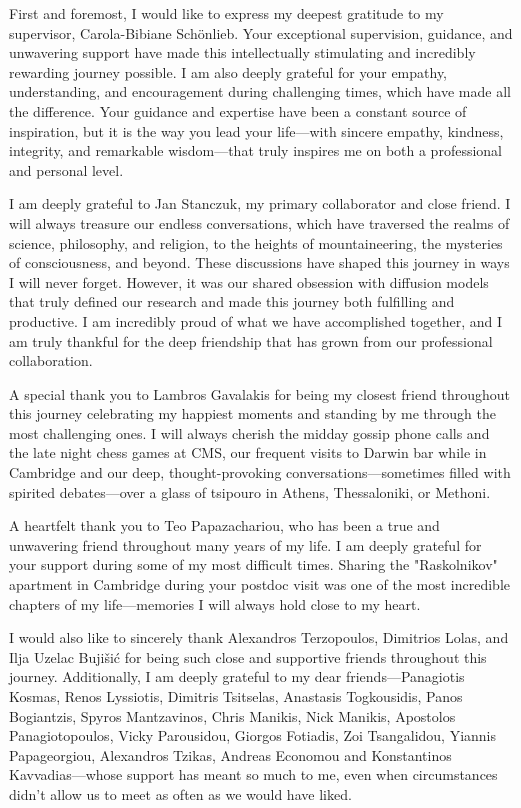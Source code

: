 
\begin{acknowledgements}      

First and foremost, I would like to express my deepest gratitude to my supervisor, Carola-Bibiane Schönlieb. Your exceptional supervision, guidance, and unwavering support have made this intellectually stimulating and incredibly rewarding journey possible. I am also deeply grateful for your empathy, understanding, and encouragement during challenging times, which have made all the difference. Your guidance and expertise have been a constant source of inspiration, but it is the way you lead your life—with sincere empathy, kindness, integrity, and remarkable wisdom—that truly inspires me on both a professional and personal level.

I am deeply grateful to Jan Stanczuk, my primary collaborator and close friend. I will always treasure our endless conversations, which have traversed the realms of science, philosophy, and religion, to the heights of mountaineering, the mysteries of consciousness, and beyond. These discussions have shaped this journey in ways I will never forget. However, it was our shared obsession with diffusion models that truly defined our research and made this journey both fulfilling and productive. I am incredibly proud of what we have accomplished together, and I am truly thankful for the deep friendship that has grown from our professional collaboration.

A special thank you to Lambros Gavalakis for being my closest friend throughout this journey celebrating my happiest moments and standing by me through the most challenging ones. I will always cherish the midday gossip phone calls and the late night chess games at CMS, our frequent visits to Darwin bar while in Cambridge and our deep, thought-provoking conversations—sometimes filled with spirited debates—over a glass of tsipouro in Athens, Thessaloniki, or Methoni.

A heartfelt thank you to Teo Papazachariou, who has been a true and unwavering friend throughout many years of my life. I am deeply grateful for your support during some of my most difficult times. Sharing the "Raskolnikov" apartment in Cambridge during your postdoc visit was one of the most incredible chapters of my life—memories I will always hold close to my heart.

I would also like to sincerely thank Alexandros Terzopoulos, Dimitrios Lolas, and Ilja Uzelac Bujišić for being such close and supportive friends throughout this journey. Additionally, I am deeply grateful to my dear friends—Panagiotis Kosmas, Renos Lyssiotis, Dimitris Tsitselas, Anastasis Togkousidis, Panos Bogiantzis, Spyros Mantzavinos, Chris Manikis, Nick Manikis, Apostolos Panagiotopoulos, Vicky Parousidou, Giorgos Fotiadis, Zoi Tsangalidou, Yiannis Papageorgiou, Alexandros Tzikas, Andreas Economou and Konstantinos Kavvadias—whose support has meant so much to me, even when circumstances didn’t allow us to meet as often as we would have liked.


\end{acknowledgements}
